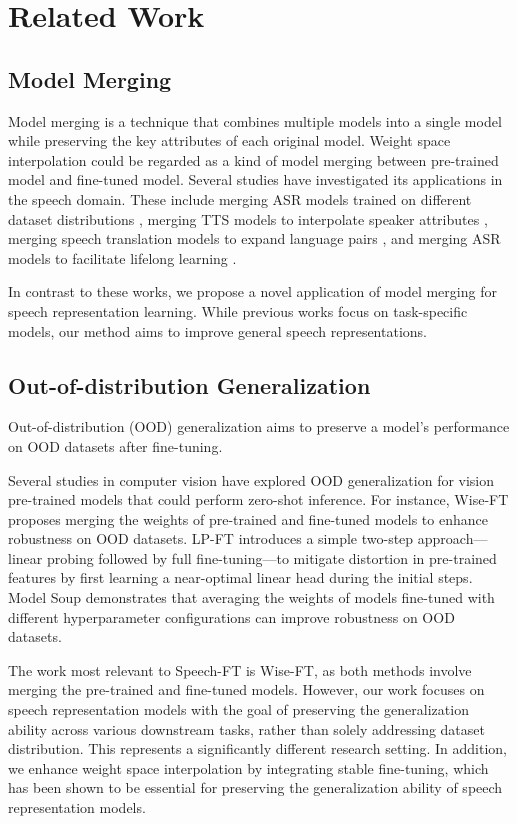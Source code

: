 \section{Related Work}
\subsection{Model Merging}
Model merging is a technique that combines multiple models into a single model while preserving the key attributes of each original model. 
Weight space interpolation could be regarded as a kind of model merging between pre-trained model and fine-tuned model.
Several studies have investigated its applications in the speech domain. These include merging ASR models trained on different dataset distributions \cite{ramesh2024task, plantinga2024parameter}, merging TTS models to interpolate speaker attributes \cite{murata2024attribute}, merging speech translation models to expand language pairs \cite{cheng2024task}, and merging ASR models to facilitate lifelong learning \cite{kulshreshtha2024sequential}.

In contrast to these works, we propose a novel application of model merging for speech representation learning. While previous works focus on task-specific models, our method aims to improve general speech representations. 

\subsection{Out-of-distribution Generalization}
Out-of-distribution (OOD) generalization aims to preserve a model's performance on OOD datasets after fine-tuning. 

Several studies in computer vision have explored OOD generalization for vision pre-trained models that could perform zero-shot inference.
For instance, Wise-FT \cite{wortsman2022robust} proposes merging the weights of pre-trained and fine-tuned models to enhance robustness on OOD datasets. 
LP-FT \cite{kumar2022fine} introduces a simple two-step approach—linear probing followed by full fine-tuning—to mitigate distortion in pre-trained features by first learning a near-optimal linear head during the initial steps.
Model Soup \cite{wortsman2022model} demonstrates that averaging the weights of models fine-tuned with different hyperparameter configurations can improve robustness on OOD datasets. 

The work most relevant to Speech-FT is Wise-FT, as both methods involve merging the pre-trained and fine-tuned models.  
However, our work focuses on speech representation models with the goal of preserving the generalization ability across various downstream tasks, rather than solely addressing dataset distribution. This represents a significantly different research setting.
In addition, we enhance weight space interpolation by integrating stable fine-tuning, which has been shown to be essential for preserving the generalization ability of speech representation models.

